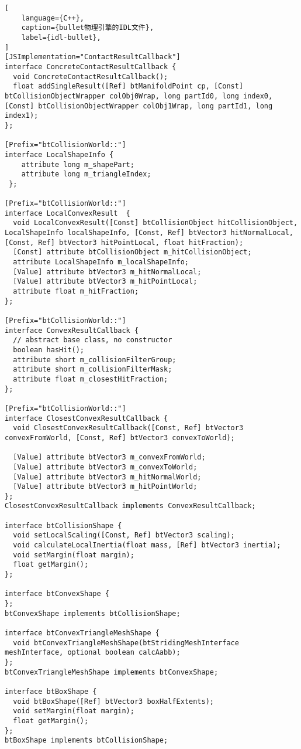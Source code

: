 \begin{lstlisting}[
    language={C++},
    caption={bullet物理引擎的IDL文件},
    label={idl-bullet},
]
[JSImplementation="ContactResultCallback"]
interface ConcreteContactResultCallback {
  void ConcreteContactResultCallback();
  float addSingleResult([Ref] btManifoldPoint cp, [Const] btCollisionObjectWrapper colObj0Wrap, long partId0, long index0, [Const] btCollisionObjectWrapper colObj1Wrap, long partId1, long index1);
};

[Prefix="btCollisionWorld::"]
interface LocalShapeInfo {
    attribute long m_shapePart;
    attribute long m_triangleIndex;
 };

[Prefix="btCollisionWorld::"]
interface LocalConvexResult  {
  void LocalConvexResult([Const] btCollisionObject hitCollisionObject, LocalShapeInfo localShapeInfo, [Const, Ref] btVector3 hitNormalLocal, [Const, Ref] btVector3 hitPointLocal, float hitFraction);
  [Const] attribute btCollisionObject m_hitCollisionObject;
  attribute LocalShapeInfo m_localShapeInfo;
  [Value] attribute btVector3 m_hitNormalLocal;
  [Value] attribute btVector3 m_hitPointLocal;
  attribute float m_hitFraction;
};

[Prefix="btCollisionWorld::"]
interface ConvexResultCallback {
  // abstract base class, no constructor
  boolean hasHit();
  attribute short m_collisionFilterGroup;
  attribute short m_collisionFilterMask;
  attribute float m_closestHitFraction;
};

[Prefix="btCollisionWorld::"]
interface ClosestConvexResultCallback {
  void ClosestConvexResultCallback([Const, Ref] btVector3 convexFromWorld, [Const, Ref] btVector3 convexToWorld);

  [Value] attribute btVector3 m_convexFromWorld;
  [Value] attribute btVector3 m_convexToWorld;
  [Value] attribute btVector3 m_hitNormalWorld;
  [Value] attribute btVector3 m_hitPointWorld;
};
ClosestConvexResultCallback implements ConvexResultCallback;

interface btCollisionShape {
  void setLocalScaling([Const, Ref] btVector3 scaling);
  void calculateLocalInertia(float mass, [Ref] btVector3 inertia);
  void setMargin(float margin);
  float getMargin();
};

interface btConvexShape {
};
btConvexShape implements btCollisionShape;

interface btConvexTriangleMeshShape {
  void btConvexTriangleMeshShape(btStridingMeshInterface meshInterface, optional boolean calcAabb);
};
btConvexTriangleMeshShape implements btConvexShape;

interface btBoxShape {
  void btBoxShape([Ref] btVector3 boxHalfExtents);
  void setMargin(float margin);
  float getMargin();
};
btBoxShape implements btCollisionShape;


\end{lstlisting}
